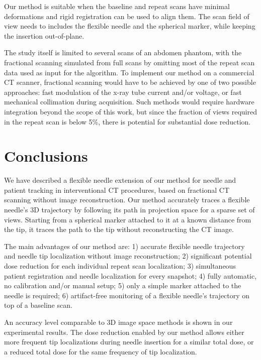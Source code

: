 \documentclass[letterpaper, 11 pt, conference]{ieeeconf}  %
\begin{document}
Our method is suitable when the baseline and repeat scans have minimal deformations and rigid registration can be used to align them. The scan field of view needs to includes the flexible needle and the spherical marker, while keeping the insertion out-of-plane.

The study itself is limited to several scans of an abdomen phantom, with the fractional scanning simulated from full scans by omitting most of the repeat scan data used as input for the algorithm. To implement our method on a commercial CT scanner, fractional scanning would have to be achieved by one of two possible approaches: fast modulation of the x-ray tube current and/or voltage, or fast mechanical collimation during acquisition. Such methods would require hardware integration beyond the scope of this work, but since the fraction of views required in the repeat scan is below 5\%, there is potential for substantial dose reduction.


\section{Conclusions}
We have described a flexible needle extension of our method for needle and patient tracking in interventional CT procedures, based on fractional CT scanning without image reconstruction.
Our method accurately traces a flexible needle's 3D trajectory by following its path in projection space for a sparse set of views. Starting from a spherical marker attached to it at a known distance from the tip, it traces the path to the tip without reconstructing the CT image.

The main advantages of our method are:
1) accurate flexible needle trajectory and needle tip localization without image reconstruction;
2) significant potential dose reduction for each individual repeat scan localization;
3) simultaneous patient registration and needle localization for every snapshot; 
4) fully automatic, no calibration and/or manual setup;
5) only a simple marker attached to the needle is required; 
6) artifact-free monitoring of a flexible needle's trajectory on top of a baseline scan.

An accuracy level comparable to 3D image space methods is shown in our experimental results.
The dose reduction enabled by our method allows either more frequent tip localizations during needle insertion for a similar total dose, or a reduced total dose for the same frequency of tip localization.





\end{document}
